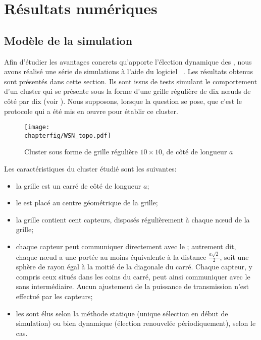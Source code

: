 \section{Résultats numériques}
\label{sa:sec:resultats}
    \subsection{Modèle de la simulation}\label{sa:ssec:modelsim}

Afin d'étudier les avantages concrets qu'apporte l'élection dynamique des \cns, nous avons réalisé une série de simulations à l'aide du logiciel \nsii~\cite{ns2}.
Les résultats obtenus sont présentés dans cette section.
Ils sont issus de tests simulant le comportement d'un cluster qui se présente sous la forme d'une grille régulière de dix nœuds de côté par dix (voir ).
Nous supposons, lorsque la question se pose, que c'est le protocole \leach qui a été mis en œuvre pour établir ce cluster.
\begin{figure}[!b]
    \centering
    \texttt{[image: \\chapterfig/WSN\_topo.pdf]}
    \caption{Cluster sous forme de grille régulière $10 \times 10$, de côté de longueur $a$}\label{sa:fig:grille}
\end{figure}

Les caractéristiques du cluster étudié sont les suivantes:
\begin{itemize}
    \item la grille est un carré de côté de longueur $a$;
    \item le \ch est placé au centre géométrique de la grille;
    \item la grille contient cent capteurs, disposés régulièrement à chaque nœud de la grille;
    \item chaque capteur peut communiquer directement avec le \ch; autrement dit, chaque nœud a une portée au moins équivalente à la distance $\frac{a \sqrt{2}}{2}$, soit une sphère de rayon égal à la moitié de la diagonale du carré. Chaque capteur, y compris ceux situés dans les coins du carré, peut ainsi communiquer avec le \ch sans intermédiaire. Aucun ajustement de la puissance de transmission n'est effectué par les capteurs;
    \item les \cns sont élus selon la méthode statique (unique sélection en début de simulation) ou bien dynamique (élection renouvelée périodiquement), selon le cas.
\end{itemize}

